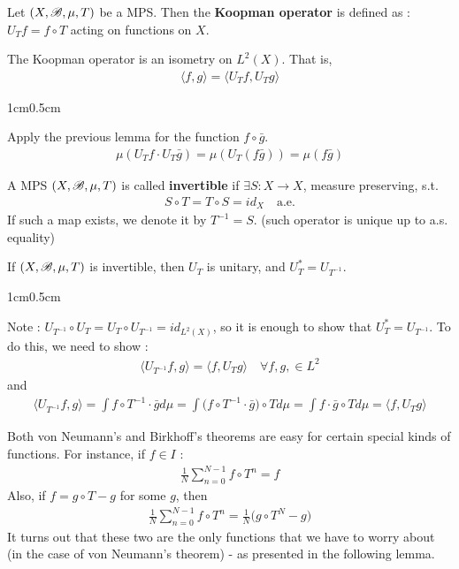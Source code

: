 \documentclass[10pt,a4paper]{report}
\newenvironment{proof}
{\begin{changemargin}{1cm}{0.5cm} 
	}%
	{\end{changemargin}
}
\begin{document}
 Let $(X,\mathscr{B}, \mu, T)$ be a MPS. Then the \textbf{Koopman operator} is defined as : $U_T f = f\circ T$ acting on functions on $X$.
\s

\lem The Koopman operator is an isometry on $L^2(X)$. That is,
\begin{align*}
\langle f,g\rangle = \langle U_T f, U_T g \rangle
\end{align*}
\begin{proof}
\pf Apply the previous lemma for the function $f\circ \bar{g}$.
\begin{align*}
\mu(U_T f \cdot U_T \bar{g}) = \mu(U_T(f\bar{g})) = \mu(f\bar{g})
\end{align*}

\eop
\end{proof}
\s

 A MPS $(X,\mathscr{B}, \mu, T)$ is called \textbf{invertible} if $\exists S:X\rightarrow X$, measure preserving, s.t.
\begin{align*}
S\circ T = T\circ S= id_X \quad \text{a.e.}
\end{align*}
If such a map exists, we denote it by $T^{-1} = S$. (such operator is unique up to a.s. equality)
\s

\lem If $(X,\mathscr{B}, \mu, T)$ is invertible, then $U_T$ is unitary, and $U^*_T = U_{T^{-1}}$.

\begin{proof}
\pf Note : $U_{T^{-1}} \circ U_T = U_T \circ U_{T^{-1}} = id_{L^2(X)}$, so it is enough to show that $U^*_T = U_{T^{-1}}$. To do this, we need to show :
\begin{align*}
\langle U_{T^{-1}} f, g\rangle = \langle f, U_T g\rangle \quad \forall f,g, \in L^2
\end{align*}
and
\begin{align*}
\langle U_{T^{-1}} f, g\rangle = \int f\circ T^{-1} \cdot \bar{g} d\mu = \int \Big( f\circ T^{-1} \cdot \bar{g}  \Big) \circ T d\mu = \int f\cdot \bar{g} \circ T d\mu = \langle f, U_T g\rangle
\end{align*}

\eop
\end{proof}
\s

\quad Both von Neumann's and Birkhoff's theorems are easy for certain special kinds of functions. For instance, if $f\in I$ :
\begin{align*}
\frac{1}{N} \sum_{n=0}^{N-1} f\circ T^n =f
\end{align*}
Also, if $f= g \circ T -g$ for some $g$, then
\begin{align*}
\frac{1}{N} \sum_{n=0}^{N-1} f\circ T^n = \frac{1}{N}\big( g\circ T^N - g \big)
\end{align*}
It turns out that these two are the only functions that we have to worry about (in the case of von Neumann's theorem) - as presented in the following lemma.
\s
\end{document}
